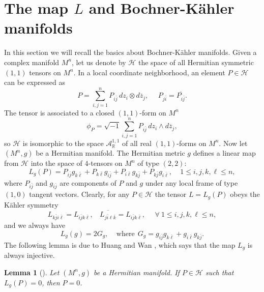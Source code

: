 \documentclass{amsart}
\newtheorem{lemma}{Lemma}
\numberwithin{equation}{section}
\begin{document}
\vspace{0.3cm}

\section{The map $L$ and Bochner-K\"ahler manifolds}

In this section we will recall the basics about Bochner-K\"ahler manifolds. Given a complex manifold $M^n$, let us denote by ${\mathcal H}$ the space of all Hermitian symmetric $(1,1)$ tensors on $M^n$. In a local coordinate neighborhood, an element $P \in {\mathcal H}$ can be expressed as
$$ P = \sum_{i,j=1}^n P_{i\bar{j}} \,dz_i \otimes d\overline{z}_j, \ \ \ \ \ \ P_{j\bar{i}} = \overline{P_{i\bar{j}}}.  $$
The tensor is associated to a closed $(1,1)$-form on $M^n$
$$ \phi_P = \sqrt{-1}\sum_{i,j=1}^n P_{i\bar{j}} \,dz_i \wedge d\overline{z}_j,$$
so ${\mathcal H}$ is isomorphic to the space ${\mathcal A}^{1,1}_{\mathbb R}$ of all real $(1,1)$-forms on $M^n$. Now let $(M^n,g)$ be a Hermitian manifold. The Hermitian metric $g$ defines a linear map from ${\mathcal H}$ into the space of $4$-tensors on $M^n$ of type $(2,2)$:
\begin{equation} \label{eq:Ldef}
L_g (P) = P_{i\bar{j}} g_{k\bar{\ell}} +  P_{k\bar{\ell}} g_{i\bar{j}} + P_{i\bar{\ell}} g_{k\bar{j}} + P_{k\bar{j}} g_{i\bar{\ell}}, \ \ \ \ \ 1\leq i,j,k,\ell \leq n,
\end{equation}
where $P_{i\bar{j}}$ and $g_{i\bar{j}}$ are components of $P$ and $g$ under any local frame of type $(1,0)$ tangent vectors. Clearly, for any $P\in {\mathcal H}$ the tensor $L=L_g(P)$ obeys the K\"ahler symmetry
\begin{equation}
 L_{k\bar{j}i\bar{\ell}} = L_{i\bar{j}k\bar{\ell}} , \ \ \ \ \overline{L_{j\bar{i}\ell \bar{k}}} =L_{i\bar{j}k\bar{\ell}}, \ \ \ \ \ \ \forall \ 1\leq i,j,k,\ell \leq n,
 \end{equation}
and we always have
\begin{equation}
L_g(g)=2G_g, \ \ \ \ \ \mbox{where} \ \ G_g = g_{i\bar{j}} g_{k\bar{\ell}} + g_{i\bar{\ell}} g_{k\bar{j}}.
 \end{equation}
The following lemma is due to Huang and Wan \cite[Lemma 3.1]{HW}, which says that the map $L_g$ is always injective.
\begin{lemma}[\cite{HW}] \label{lemma-injective}
Let $(M^n,g)$ be a Hermitian manifold. If $P\in {\mathcal H}$ such that $L_g(P)=0$, then $P=0$. \end{lemma}
\end{document}
